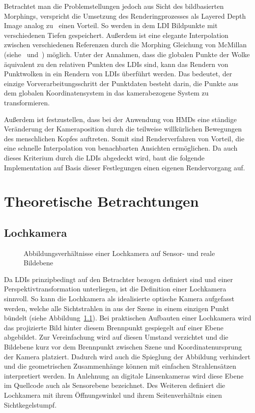 \documentclass[hyperref, beleg, german]{cgvpub}
\begin{document}
Betrachtet man die Problemstellungen jedoch aus Sicht des bildbasierten
Morphings, verspricht die Umsetzung des Renderingprozesses als Layered Depth
Image analog zu~\cite{chang1999ldi} einen Vorteil. So werden in dem LDI
Bildpunkte mit verschiedenen Tiefen gespeichert. Außerdem ist eine elegante
Interpolation zwischen verschiedenen Referenzen durch die Morphing Gleichung
von McMillan (siehe~\cite{mcmillan1995list} und~\cite{mcmillan1995plenoptic})
möglich. Unter der Annahmen, dass die globalen Punkte der Wolke äquivalent zu
den relativen Punkten des LDIs sind, kann das Rendern von Punktwolken in ein
Rendern von LDIs überführt werden. Das bedeutet, der einzige
Vorverarbeitungsschritt der Punktdaten besteht darin, die Punkte aus dem
globalen Koordinatensystem in das kamerabezogene System zu transformieren.

Außerdem ist festzustellen, dass bei der Anwendung von HMDs eine ständige
Veränderung der Kameraposition durch die teilweise willkürlichen Bewegungen des
menschlichen Kopfes auftreten. Somit sind Renderverfahren von Vorteil, die eine
schnelle Interpolation von benachbarten Ansichten ermöglichen. Da auch dieses
Kriterium durch die LDIs abgedeckt wird, baut die folgende Implementation auf
Basis dieser Festlegungen einen eigenen Rendervorgang auf.

\chapter{Theoretische Betrachtungen}

\section{Lochkamera}

\begin{figure}
	\centering
	
	\caption{Abbildungsverhältnisse einer Lochkamera auf Sensor- und reale
		Bildebene}%
	\label{fig:pinholecamera}
\end{figure}

Da LDIs prinzipbedingt auf den Betrachter bezogen definiert sind und einer
Perspektivtransformation unterliegen, ist die Definition einer Lochkamera
sinnvoll. So kann die Lochkamera als idealisierte optische Kamera aufgefasst
werden, welche alle Sichtstrahlen in aus der Szene in einem einzigen Punkt
bündelt (siehe Abbildung~\ref{fig:pinholecamera}). Bei praktischen Aufbauten
einer Lochkamera wird das projizierte Bild hinter diesem Brennpunkt gespiegelt
auf einer Ebene abgebildet. Zur Vereinfachung wird auf diesen Umstand
verzichtet und die Bildebene kurz vor dem Brennpunkt zwischen Szene und
Koordinatenursprung der Kamera platziert. Dadurch wird auch die Spieglung der
Abbildung verhindert und die geometrischen Zusammenhänge können mit einfachen
Strahlensätzen interpretiert werden. In Anlehnung an digitale Linsenkameras
wird diese Ebene im Quellcode auch als Sensorebene bezeichnet. Des Weiteren
definiert die Lochkamera mit ihrem Öffnungswinkel und ihrem Seitenverhältnis
einen Sichtkegelstumpf.
\end{document}
